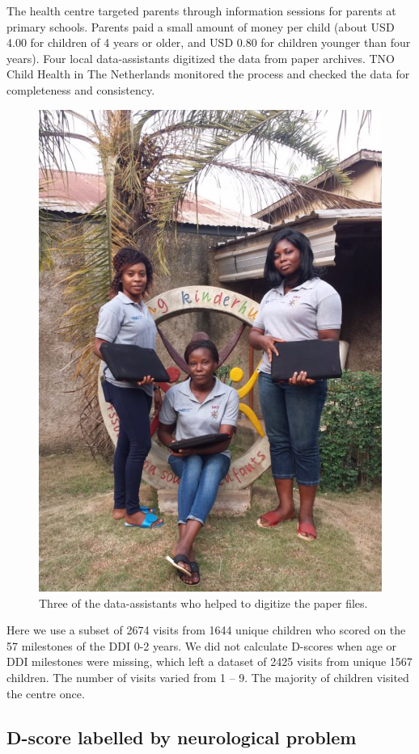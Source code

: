 \documentclass[
]{book}
\begin{document}
The health centre targeted parents through information sessions for parents at primary schools. Parents paid a small amount of money per child (about USD 4.00 for children of 4 years or older, and USD 0.80 for children younger than four years). Four local data-assistants digitized the data from paper archives. TNO Child Health in The Netherlands monitored the process and checked the data for completeness and consistency.

\begin{figure}

{\centering \includegraphics[width=0.6\linewidth]{fig/data_assistents} 

}

\caption{Three of the data-assistants who helped to digitize the paper files.}\label{fig:dataassistents}
\end{figure}



Here we use a subset of 2674 visits from 1644 unique children who scored on the 57 milestones of the DDI 0-2 years. We did not calculate D-scores when age or DDI milestones were missing, which left a dataset of 2425 visits from unique 1567 children. The number of visits varied from 1 -- 9. The majority of children visited the centre once.

\hypertarget{sec:togoneuro}{%
\subsection{D-score labelled by neurological problem}\label{sec:togoneuro}}
\end{document}
